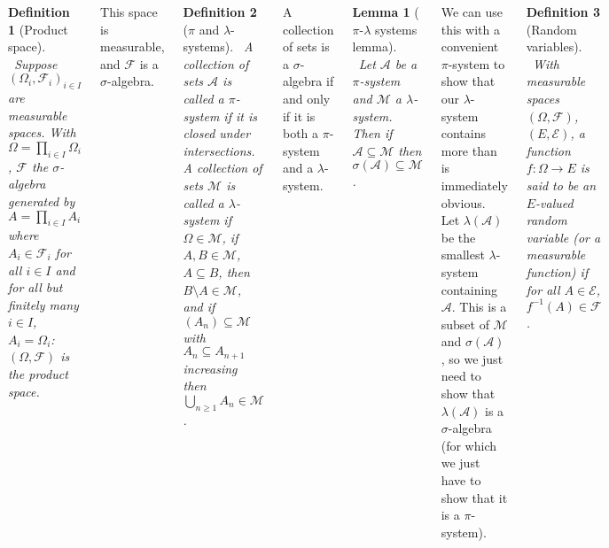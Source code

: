 \documentclass{tikzposter} %
\newtheorem{lemma}[theorem]{Lemma}
\newtheorem{definition}{Definition}
\begin{document}
\begin{columns}
{    \begin{definition}[Product space]
    \ Suppose $(\Omega_{i}, \mathcal{F}_{i})_{i \in I}$ are measurable spaces. With $\Omega = \prod_{i \in I} \Omega_{i}$, $\mathcal{F}$ the $\sigma$-algebra generated by $A = \prod_{i \in I} A_{i}$ where $A_{i} \in \mathcal{F}_{i}$ for all $i \in I$ and for all but finitely many $i \in I$, $A_{i} = \Omega_{i}$: $(\Omega, \mathcal{F})$ is the product space.
    \end{definition}
    \hphantom{}

    This space is measurable, and $\mathcal{F}$ is a $\sigma$-algebra. \\

    \begin{definition}[$\pi$ and $\lambda$-systems]
    \ A collection of sets $\mathcal{A}$ is called a $\pi$-system if it is closed under intersections. \\

      A collection of sets $\mathcal{M}$ is called a $\lambda$-system if $\Omega \in \mathcal{M}$, if $A, B \in \mathcal{M}$, $A \subseteq B$, then $B \setminus A \in \mathcal{M}$, and if $(A_{n}) \subseteq \mathcal{M}$ with $A_{n} \subseteq A_{n+1}$ increasing then $\bigcup_{n \ge 1} A_{n} \in \mathcal{M}$.
    \end{definition}
    \hphantom{}

    A collection of sets is a $\sigma$-algebra if and only if it is both a $\pi$-system and a $\lambda$-system. \\

    \begin{lemma}[$\pi$-$\lambda$ systems lemma]
    \ Let $\mathcal{A}$ be a $\pi$-system and $\mathcal{M}$ a $\lambda$-system. Then if $\mathcal{A} \subseteq \mathcal{M}$ then $\sigma(\mathcal{A}) \subseteq \mathcal{M}$.
    \end{lemma}
    \hphantom{}

    We can use this with a convenient $\pi$-system to show that our $\lambda$-system contains more than is immediately obvious. \\

    Let $\lambda(\mathcal{A})$ be the smallest $\lambda$-system containing $\mathcal{A}$. This is a subset of $\mathcal{M}$ and $\sigma(\mathcal{A})$, so we just need to show that $\lambda(\mathcal{A})$ is a $\sigma$-algebra (for which we just have to show that it is a $\pi$-system). \\

    \begin{definition}[Random variables]
    \ With measurable spaces $(\Omega, \mathcal{F})$, $(E, \mathcal{E})$, a function $f : \Omega \to E$ is said to be an $E$-valued random variable (or a measurable function) if for all $A \in \mathcal{E}$, $f^{-1}(A) \in \mathcal{F}$.
    \end{definition}
    \hphantom{}

}
\end{columns}
\end{document}
